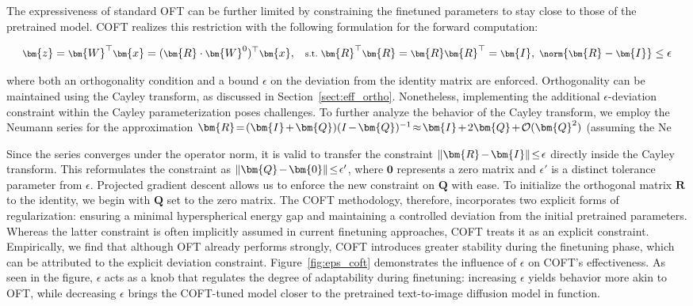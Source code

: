 The expressiveness of standard OFT can be further limited by constraining the finetuned parameters to stay close to those of the pretrained model. COFT realizes this restriction with the following formulation for the forward computation:

\begin{equation}\label{eq:coft_general}
    \footnotesize
    \bm{z}=\bm{W}^\top\bm{x}=(\bm{R}\cdot\bm{W}^0)^\top\bm{x},~~~\text{s.t.}~\bm{R}^\top\bm{R}=\bm{R}\bm{R}^\top=\bm{I},~\norm{\bm{R}-\bm{I}}\leq \epsilon
\end{equation}

where both an orthogonality condition and a bound $\epsilon$ on the deviation from the identity matrix are enforced. Orthogonality can be maintained using the Cayley transform, as discussed in Section~\ref{sect:eff_ortho}. Nonetheless, implementing the additional $\epsilon$-deviation constraint within the Cayley parameterization poses challenges. To further analyze the behavior of the Cayley transform, we employ the Neumann series for the approximation $\thickmuskip=2mu \medmuskip=2mu \bm{R}=(\bm{I}+\bm{Q})(I-\bm{Q})^{-1} \approx \bm{I} + 2\bm{Q} + \mathcal{O}(\bm{Q}^2)$ (assuming the Ne

Since the series converges under the operator norm, it is valid to transfer the constraint $\thickmuskip=2mu \medmuskip=2mu\|\bm{R}-\bm{I}\|\leq\epsilon$ directly inside the Cayley transform. This reformulates the constraint as $\thickmuskip=2mu \medmuskip=2mu\|\bm{Q}-\bm{0}\|\leq\epsilon'$, where $\bm{0}$ represents a zero matrix and $\epsilon'$ is a distinct tolerance parameter from $\epsilon$. Projected gradient descent allows us to enforce the new constraint on $\bm{Q}$ with ease. To initialize the orthogonal matrix $\bm{R}$ to the identity, we begin with $\bm{Q}$ set to the zero matrix. The COFT methodology, therefore, incorporates two explicit forms of regularization: ensuring a minimal hyperspherical energy gap and maintaining a controlled deviation from the initial pretrained parameters. Whereas the latter constraint is often implicitly assumed in current finetuning approaches, COFT treats it as an explicit constraint. Empirically, we find that although OFT already performs strongly, COFT introduces greater stability during the finetuning phase, which can be attributed to the explicit deviation constraint. Figure~\ref{fig:eps_coft} demonstrates the influence of $\epsilon$ on COFT's effectiveness. As seen in the figure, $\epsilon$ acts as a knob that regulates the degree of adaptability during finetuning: increasing $\epsilon$ yields behavior more akin to OFT, while decreasing $\epsilon$ brings the COFT-tuned model closer to the pretrained text-to-image diffusion model in function.


